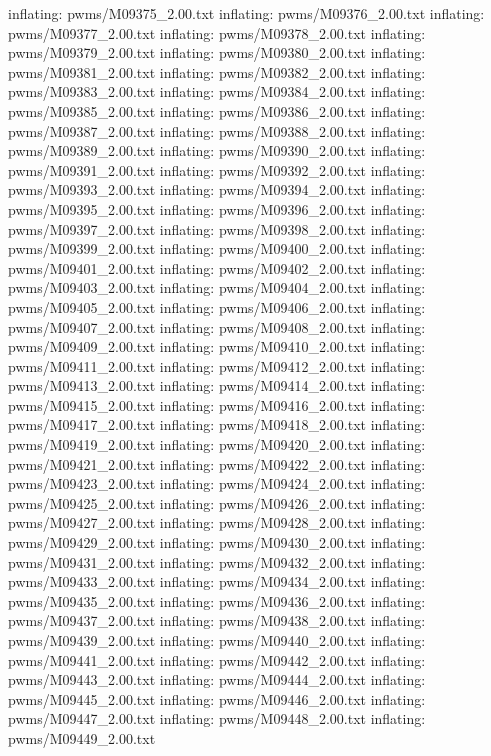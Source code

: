 \documentclass[letterpaper,10pt,english]{sphinxmanual}
\begin{document}
{\begin{sphinxVerbatim}[commandchars=\\\{\}]
  inflating: pwms/M09375\_2.00.txt
  inflating: pwms/M09376\_2.00.txt
  inflating: pwms/M09377\_2.00.txt
  inflating: pwms/M09378\_2.00.txt
  inflating: pwms/M09379\_2.00.txt
  inflating: pwms/M09380\_2.00.txt
  inflating: pwms/M09381\_2.00.txt
  inflating: pwms/M09382\_2.00.txt
  inflating: pwms/M09383\_2.00.txt
  inflating: pwms/M09384\_2.00.txt
  inflating: pwms/M09385\_2.00.txt
  inflating: pwms/M09386\_2.00.txt
  inflating: pwms/M09387\_2.00.txt
  inflating: pwms/M09388\_2.00.txt
  inflating: pwms/M09389\_2.00.txt
  inflating: pwms/M09390\_2.00.txt
  inflating: pwms/M09391\_2.00.txt
  inflating: pwms/M09392\_2.00.txt
  inflating: pwms/M09393\_2.00.txt
  inflating: pwms/M09394\_2.00.txt
  inflating: pwms/M09395\_2.00.txt
  inflating: pwms/M09396\_2.00.txt
  inflating: pwms/M09397\_2.00.txt
  inflating: pwms/M09398\_2.00.txt
  inflating: pwms/M09399\_2.00.txt
  inflating: pwms/M09400\_2.00.txt
  inflating: pwms/M09401\_2.00.txt
  inflating: pwms/M09402\_2.00.txt
  inflating: pwms/M09403\_2.00.txt
  inflating: pwms/M09404\_2.00.txt
  inflating: pwms/M09405\_2.00.txt
  inflating: pwms/M09406\_2.00.txt
  inflating: pwms/M09407\_2.00.txt
  inflating: pwms/M09408\_2.00.txt
  inflating: pwms/M09409\_2.00.txt
  inflating: pwms/M09410\_2.00.txt
  inflating: pwms/M09411\_2.00.txt
  inflating: pwms/M09412\_2.00.txt
  inflating: pwms/M09413\_2.00.txt
  inflating: pwms/M09414\_2.00.txt
  inflating: pwms/M09415\_2.00.txt
  inflating: pwms/M09416\_2.00.txt
  inflating: pwms/M09417\_2.00.txt
  inflating: pwms/M09418\_2.00.txt
  inflating: pwms/M09419\_2.00.txt
  inflating: pwms/M09420\_2.00.txt
  inflating: pwms/M09421\_2.00.txt
  inflating: pwms/M09422\_2.00.txt
  inflating: pwms/M09423\_2.00.txt
  inflating: pwms/M09424\_2.00.txt
  inflating: pwms/M09425\_2.00.txt
  inflating: pwms/M09426\_2.00.txt
  inflating: pwms/M09427\_2.00.txt
  inflating: pwms/M09428\_2.00.txt
  inflating: pwms/M09429\_2.00.txt
  inflating: pwms/M09430\_2.00.txt
  inflating: pwms/M09431\_2.00.txt
  inflating: pwms/M09432\_2.00.txt
  inflating: pwms/M09433\_2.00.txt
  inflating: pwms/M09434\_2.00.txt
  inflating: pwms/M09435\_2.00.txt
  inflating: pwms/M09436\_2.00.txt
  inflating: pwms/M09437\_2.00.txt
  inflating: pwms/M09438\_2.00.txt
  inflating: pwms/M09439\_2.00.txt
  inflating: pwms/M09440\_2.00.txt
  inflating: pwms/M09441\_2.00.txt
  inflating: pwms/M09442\_2.00.txt
  inflating: pwms/M09443\_2.00.txt
  inflating: pwms/M09444\_2.00.txt
  inflating: pwms/M09445\_2.00.txt
  inflating: pwms/M09446\_2.00.txt
  inflating: pwms/M09447\_2.00.txt
  inflating: pwms/M09448\_2.00.txt
  inflating: pwms/M09449\_2.00.txt

\end{sphinxVerbatim}}
\end{document}
